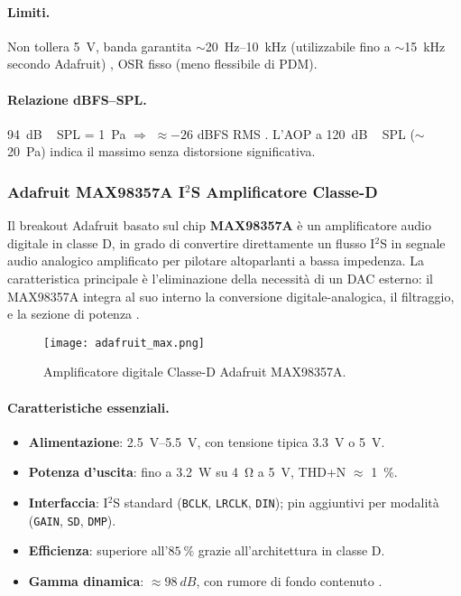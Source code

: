 \paragraph{Limiti.} Non tollera \SI{5}{V}, banda garantita $\sim$\SI{20}{Hz}--\SI{10}{kHz} (utilizzabile fino a $\sim$\SI{15}{kHz} secondo Adafruit) \cite{adafruit-product}, OSR fisso (meno flessibile di PDM).

\paragraph{Relazione dBFS--SPL.}
\SI{94}{dB\,SPL} = \SI{1}{Pa} $\Rightarrow$ $\approx -26$ dBFS RMS \cite{knowles-datasheet}. 
L’AOP a \SI{120}{dB\,SPL} ($\sim$\SI{20}{Pa}) indica il massimo senza distorsione significativa.


\subsubsection{Adafruit MAX98357A I$^2$S Amplificatore Classe-D}

Il breakout Adafruit basato sul chip \textbf{MAX98357A} è un amplificatore audio digitale in classe D, in grado di convertire direttamente un flusso
 I$^2$S in segnale audio analogico amplificato per pilotare altoparlanti a bassa impedenza. 
La caratteristica principale è l’eliminazione della necessità di un DAC esterno: il MAX98357A integra al suo interno la conversione digitale-analogica, 
il filtraggio, e la sezione di potenza \cite{maxim-datasheet,adafruit-guide-max98357}.
\begin{figure}[H]
  \centering
  \texttt{[image: adafruit\_max.png]}
  \caption{Amplificatore digitale Classe-D Adafruit MAX98357A.}
  \label{fig:adafruit_max}
  \end{figure}
\paragraph{Caratteristiche essenziali.}
\begin{itemize}
  \item \textbf{Alimentazione}: \SIrange{2.5}{5.5}{V}, con tensione tipica \SI{3.3}{V} o \SI{5}{V}. 
  \item \textbf{Potenza d’uscita}: fino a \SI{3.2}{W} su \SI{4}{\ohm} a \SI{5}{V}, THD+N $\approx$ \SI{1}{\%}.
  \item \textbf{Interfaccia}: I$^2$S standard (\texttt{BCLK}, \texttt{LRCLK}, \texttt{DIN}); pin aggiuntivi per modalità (\texttt{GAIN}, \texttt{SD}, \texttt{DMP}).
  \item \textbf{Efficienza}: superiore all’$\SI{85}{\%}$ grazie all’architettura in classe D.
  \item \textbf{Gamma dinamica}: $\approx \SI{98}{dB}$, con rumore di fondo contenuto \cite{maxim-datasheet}.
\end{itemize}


